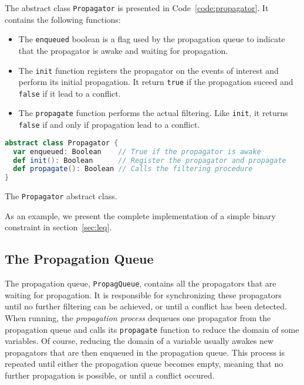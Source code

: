 \documentclass{llncs}
\begin{document}
The abstract class \texttt{Propagator} is presented in Code~\ref{code:propagator}. It contains the following functions:
\begin{itemize}
  \item The \texttt{enqueued} boolean is a flag used by the propagation queue to indicate that the propagator is awake and waiting for propagation. 

  \item The \texttt{init} function registers the propagator on the events of interest and perform its initial propagation. It return \texttt{true} if the propagation suceed and \texttt{false} if it lead to a conflict. 

  \item The \texttt{propagate} function performs the actual filtering. Like \texttt{init}, it returns \texttt{false} if and only if propagation lead to a conflict.
\end{itemize}

\begin{code}
\begin{lstlisting}[language=scala, style=lineNumber]
abstract class Propagator {
  var enqueued: Boolean    // True if the propagator is awake
  def init(): Boolean      // Register the propagator and propagate
  def propagate(): Boolean // Calls the filtering procedure 
}
\end{lstlisting}
\caption{The \texttt{Propagator} abstract class.}
\label{code:propagator}
\end{code}

\noindent
As an example, we present the complete implementation of a simple binary constraint in section~\ref{sec:leq}.

\subsection{The Propagation Queue}

The propagation queue, \texttt{PropagQueue}, contains all the propagators that are waiting for propagation. 
It is responsible for synchronizing these propagators until no further filtering can be achieved, or until a conflict has been detected. 
When running, the \emph{propagation process} dequeues one propagator from the propagation queue and calls its \texttt{propagate} function to reduce the domain of some variables. 
Of course, reducing the domain of a variable usually awakes new propagators that are then enqueued in the propagation queue. 
This process is repeated until either the propagation queue becomes empty, meaning that no further propagation is possible, or until a conflict occured.
\end{document}
